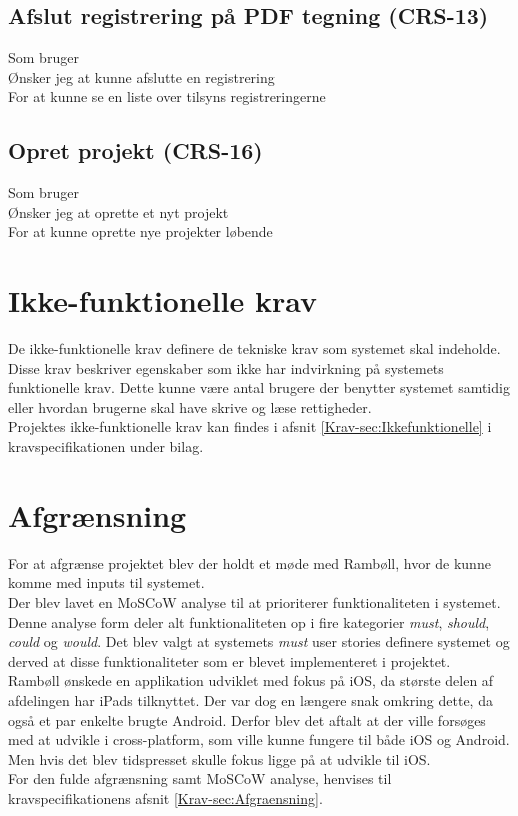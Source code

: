 	\subsection*{Afslut registrering på PDF tegning (CRS-13)}
	Som bruger\\
	Ønsker jeg at kunne afslutte en registrering\\
	For at kunne se en liste over tilsyns registreringerne
	
	\subsection*{Opret projekt (CRS-16)}
	Som bruger\\
	Ønsker jeg at oprette et nyt projekt\\
	For at kunne oprette nye projekter løbende \\
	

\section{Ikke-funktionelle krav}
De ikke-funktionelle krav definere de tekniske krav som systemet skal indeholde. Disse krav beskriver egenskaber som ikke har indvirkning på systemets funktionelle krav. Dette kunne være antal brugere der benytter systemet samtidig eller hvordan brugerne skal have skrive og læse rettigheder. \\
Projektes ikke-funktionelle krav kan findes i afsnit \ref{Krav-sec:Ikkefunktionelle} i kravspecifikationen under bilag. \\


\section{Afgrænsning}
For at afgrænse projektet blev der holdt et møde med Rambøll, hvor de kunne komme med inputs til systemet. \\
Der blev lavet en MoSCoW analyse til at prioriterer funktionaliteten i systemet. Denne analyse form deler alt funktionaliteten op i fire kategorier \emph{must}, \emph{should}, \emph{could} og \emph{would}.
Det blev valgt at systemets \emph{must} user stories definere systemet og derved at disse funktionaliteter som er blevet implementeret i projektet. \\
Rambøll ønskede en applikation udviklet med fokus på iOS, da største delen af afdelingen har iPads tilknyttet. Der var dog en længere snak omkring dette, da også et par enkelte brugte Android. Derfor blev det aftalt at der ville forsøges med at udvikle i cross-platform, som ville kunne fungere til både iOS og Android. Men hvis det blev tidspresset skulle fokus ligge på at udvikle til iOS. \\
For den fulde afgrænsning samt MoSCoW analyse, henvises til kravspecifikationens afsnit \ref{Krav-sec:Afgraensning}.
	